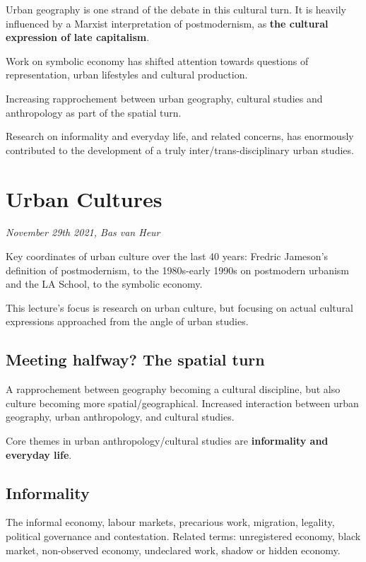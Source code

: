 \documentclass{article}
\begin{document}
Urban geography is one strand of the debate in this cultural turn. It is heavily influenced by a Marxist interpretation of postmodernism, as \textbf{the cultural expression of late capitalism}.

Work on symbolic economy has shifted attention towards questions of representation, urban lifestyles and cultural production. 

Increasing rapprochement between urban geography, cultural studies and anthropology as part of the spatial turn.

Research on informality and everyday life, and related concerns, has enormously contributed to the development of a truly inter/trans-disciplinary urban studies.


\section{Urban Cultures}
\textit{November 29th 2021, Bas van Heur}

Key coordinates of urban culture over the last 40 years: Fredric Jameson's definition of postmodernism, to the 1980s-early 1990s on postmodern urbanism and the LA School, to the symbolic economy.

This lecture's focus is research on urban culture, but focusing on actual cultural expressions approached from the angle of urban studies.

\subsection{Meeting halfway? The spatial turn}

A rapprochement between geography becoming a cultural discipline, but also culture becoming more spatial/geographical.
Increased interaction between urban geography, urban anthropology, and cultural studies.

Core themes in urban anthropology/cultural studies are \textbf{informality and everyday life}.

\subsection{Informality}

The informal economy, labour markets, precarious work, migration, legality, political governance and contestation.
Related terms: unregistered economy, black market, non-observed economy, undeclared work, shadow or hidden economy.
\end{document}
